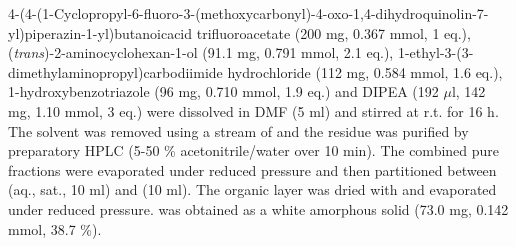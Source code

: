 {4\hyp{}(4\hyp{}(1\hyp{}Cyclopropyl\hyp{}6\hyp{}fluoro\hyp{}3\hyp{}(methoxycarbonyl)\hyp{}4\hyp{}oxo\hyp{}1,4\hyp{}dihydroquinolin\hyp{}7\hyp{}yl)piperazin\hyp{}1\hyp{}yl)butanoic\hfill acid trifluoroacetate  (200 mg, 0.367 mmol, 1 eq.), (\textit{trans})\hyp{}2\hyp{}aminocyclohexan\hyp{}1\hyp{}ol  (91.1 mg, 0.791 mmol, 2.1 eq.), 1-ethyl-3-(3-dimethylaminopropyl)carbodi\allowbreak imide hydrochloride (112 mg, 0.584 mmol, 1.6 eq.), 1-hydroxyben\allowbreak zotriazole (96 mg, 0.710 mmol, 1.9 eq.) and DIPEA (192 $\mu$l, 142 mg, 1.10 mmol, 3 eq.) were dissolved in DMF (5 ml) and stirred at r.t. for 16 h. The solvent was removed using a stream of  and the residue was purified by preparatory HPLC (5-50 \% acetonitrile/water over 10 min). The combined pure fractions were evaporated under reduced pressure and then partitioned between  (aq., sat., 10 ml) and  (10 ml). The organic layer was dried with  and evaporated under reduced pressure.  was obtained as a white amorphous solid (73.0 mg, 0.142 mmol, 38.7 \%).
\\[1\baselineskip]
\\[1\baselineskip]
}
